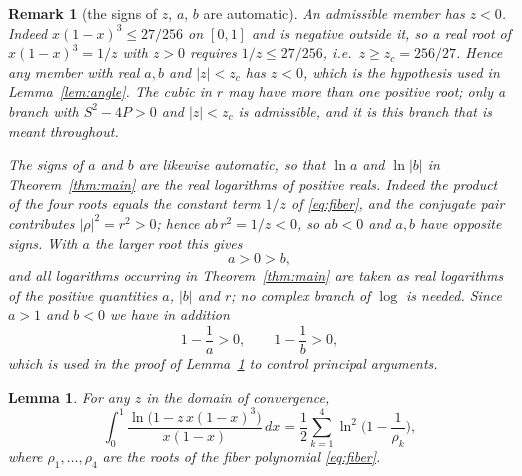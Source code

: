 \documentclass[10pt,a4paper]{amsart}
\newtheorem{lemma}{Lemma}
\newtheorem{remark}{Remark}
\begin{document}
\begin{remark}[the signs of $z$, $a$, $b$ are automatic]\label{rem:signs}
An admissible member has $z<0$. Indeed $x(1-x)^3\le 27/256$ on $[0,1]$ and is negative outside it, so
a real root of $x(1-x)^3=1/z$ with $z>0$ requires $1/z\le27/256$, i.e.\ $z\ge z_c=256/27$. Hence any
member with real $a,b$ and $|z|<z_c$ has $z<0$, which is the hypothesis used in Lemma~\ref{lem:angle}.
The cubic in $r$ may have more than one positive root; only a branch with $S^2-4P>0$ and $|z|<z_c$ is
admissible, and it is this branch that is meant throughout.

The signs of $a$ and $b$ are likewise automatic, so that $\ln a$ and $\ln|b|$ in
Theorem~\ref{thm:main} are the real logarithms of positive reals. Indeed the product of the four
roots equals the constant term $1/z$ of \eqref{eq:fiber}, and the conjugate pair contributes
$|\rho|^2=r^2>0$; hence $ab\,r^2=1/z<0$, so $ab<0$ and $a,b$ have opposite signs. With $a$ the larger
root this gives
\[
  a>0>b ,
\]
and all logarithms occurring in Theorem~\ref{thm:main} are taken as real logarithms of the positive
quantities $a$, $|b|$ and $r$; no complex branch of $\log$ is needed. Since $a>1$ and $b<0$ we have
in addition
\[
  1-\frac1a>0,\qquad 1-\frac1b>0,
\]
which is used in the proof of Lemma~\ref{lem:landen} to control principal arguments.
\end{remark}

\begin{lemma}\label{lem:landen}
For any $z$ in the domain of convergence,
\[
  \int_0^1\frac{\ln\!\big(1-z\,x(1-x)^3\big)}{x(1-x)}\,dx
  =\frac12\sum_{k=1}^4\ln^2\!\Big(1-\frac1{\rho_k}\Big),
\]
where $\rho_1,\dots,\rho_4$ are the roots of the fiber polynomial \eqref{eq:fiber}.
\end{lemma}
\end{document}
